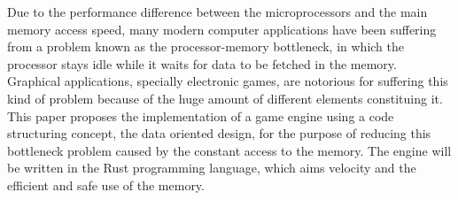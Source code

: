 Due to the performance difference between the microprocessors and the main memory access 
speed, many modern computer applications have been suffering from a problem known as 
the processor-memory bottleneck, in which the processor stays idle while it waits for 
data to be fetched in the memory. Graphical applications, specially electronic games, are 
notorious for suffering this kind of problem because of the huge amount of different 
elements constituing it. This paper proposes the implementation of a game engine
using a code structuring concept, the data oriented design, for the purpose of reducing
this bottleneck problem caused by the constant access to the memory. The engine will be 
written in the Rust programming language, which aims velocity and the efficient 
and safe use of the memory.
